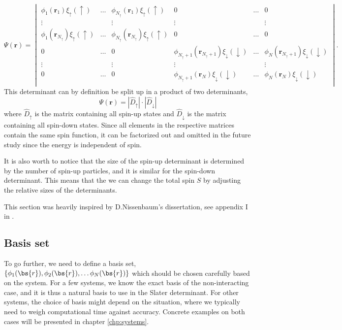 \begin{equation*}
\Psi(\boldsymbol{r})=
\begin{vmatrix}
\phi_1(\boldsymbol{r}_1)\xi_{\uparrow}(\uparrow) & \hdots & \phi_{N_{\uparrow}}(\boldsymbol{r}_1)\xi_{\uparrow}(\uparrow) & 0 & \hdots & 0\\
\vdots & & \vdots & \vdots & & \vdots \\
\phi_1(\boldsymbol{r}_{N_{\uparrow}})\xi_{\uparrow}(\uparrow) & \hdots & \phi_{N_{\uparrow}}(\boldsymbol{r}_{N_{\uparrow}})\xi_{\uparrow}(\uparrow) & 0 & \hdots & 0\\
0 & \hdots & 0 & \phi_{N_{\uparrow}+1}(\boldsymbol{r}_{N_{\uparrow}+1})\xi_{\downarrow}(\downarrow) & \hdots & \phi_{N}(\boldsymbol{r}_{N_{\uparrow}+1})\xi_{\downarrow}(\downarrow)\\
\vdots & & \vdots & \vdots & & \vdots \\
0 & \hdots & 0 & \phi_{N_{\uparrow}+1}(\boldsymbol{r}_N)\xi_{\downarrow}(\downarrow) & \hdots & \phi_{N}(\boldsymbol{r}_N)\xi_{\downarrow}(\downarrow)\\
\end{vmatrix}.
\end{equation*}
This determinant can by definition be split up in a product of two determinants,
\begin{equation}
\Psi(\boldsymbol{r})=|\hat{D}_{\uparrow}|\cdot |\hat{D}_{\downarrow}|
\end{equation}
where $\hat{D}_{\uparrow}$ is the matrix containing all spin-up states and $\hat{D}_{\downarrow}$ is the matrix containing all spin-down states. Since all elements in the respective matrices contain the same spin function, it can be factorized out and omitted in the future study since the energy is independent of spin.

It is also worth to notice that the size of the spin-up determinant is determined by the number of spin-up particles, and it is similar for the spin-down determinant. This means that the we can change the total spin $S$ by adjusting the relative sizes of the determinants.

This section was heavily inspired by D.Nissenbaum's dissertation, see appendix I in \cite{nissenbaum_stochastic_2008}.

\subsection{Basis set} \label{subsec:basisset}
To go further, we need to define a basis set, $\{\phi_1(\bs{r}),\phi_2(\bs{r}),\hdots\phi_N(\bs{r})\}$ which should be chosen carefully based on the system. For a few systems, we know the exact basis of the non-interacting case, and it is thus a natural basis to use in the Slater determinant. For other systems, the choice of basis might depend on the situation, where we typically need to weigh computational time against accuracy. Concrete examples on both cases will be presented in chapter \eqref{chp:systems}.

